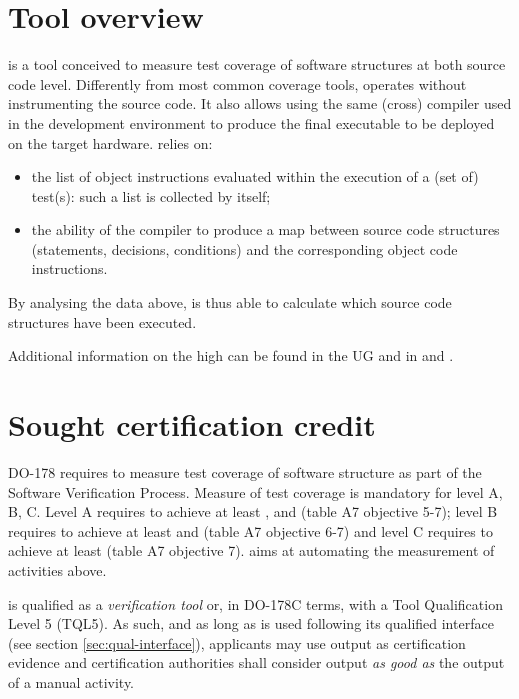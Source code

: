 \documentclass {report}
\begin{document}
\section{Tool overview}
\xcov is a tool conceived to measure test coverage of software structures at both source code level. Differently from most common coverage tools, \xcov operates without instrumenting the source code. It also allows using the same (cross) compiler used in the development environment to produce the final executable to be deployed on the target hardware. \xcov relies on:
\begin{itemize}
\item the list of object instructions evaluated within the execution of a (set of) test(s): such a list is collected by \xcov itself; 
\item the ability of the compiler to produce a map between source code structures (statements, decisions, conditions) and the corresponding object code instructions.
\end{itemize}
By analysing the data above, \xcov is thus able to calculate which source code structures have been executed.

Additional information on the high \xcov can be found in the \xcov UG and in \adaeurope and \erts.

\section {Sought certification credit}
DO-178 requires to measure test coverage of software structure as part of the Software Verification Process. Measure of test coverage is mandatory for level A, B, C. Level A requires to achieve at least \mcdc, \dc and \stc (table A7 objective 5-7); level B requires to achieve at least \dc and \stc (table A7 objective 6-7) and level C requires to achieve at least \stc (table A7 objective 7). \xcov aims at automating the measurement of activities above.

\xcov is qualified as a \emph{verification tool} or, in DO-178C terms, with a Tool Qualification Level 5 (TQL5). As such, and as long as \xcov is used following its qualified interface (see section \ref{sec:qual-interface}), applicants may use \xcov output as certification evidence and certification authorities shall consider \xcov output \emph{as good as} the output of a manual activity.
\end{document}
